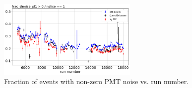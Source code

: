 \documentclass[a4paper]{article}
\begin{document}
\begin{figure}[H]
    \centering
    \includegraphics[width=0.60\textwidth]{stability/pmtnoise1.png}
    \caption{Fraction of events with non-zero PMT noise vs. run number.}
    \label{fig:pmtnoise}
\end{figure}






\newpage
\end{document}
